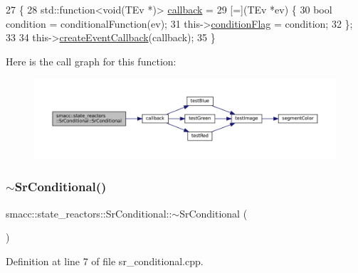 \begin{DoxyCode}
27     \{
28         std::function<void(TEv *)> \hyperlink{servers_2opencv__perception__node_2opencv__perception__node_8cpp_a050e697bd654facce10ea3f6549669b3}{callback} =
29             [=](TEv *ev) \{
30                 \textcolor{keywordtype}{bool} condition = conditionalFunction(ev);
31                 this->\hyperlink{classsmacc_1_1state__reactors_1_1SrConditional_a3642c78c02f02ed8eb0e5a41240f445c}{conditionFlag} = condition;
32             \};
33 
34         this->\hyperlink{classsmacc_1_1StateReactor_a68482e08f6449694a0bcda843b14b376}{createEventCallback}(callback);
35     \}
\end{DoxyCode}
Here is the call graph for this function\+:
\nopagebreak
\begin{figure}[H]
\begin{center}
\leavevmode
\includegraphics[width=350pt]{classsmacc_1_1state__reactors_1_1SrConditional_ab89bc8f9d29e8a614eb6618af8596402_cgraph}
\end{center}
\end{figure}
\mbox{\label{classsmacc_1_1state__reactors_1_1SrConditional_a36266efcfd8ba0582ed500bd51e7d2b6}} 
\subsubsection{\texorpdfstring{$\sim$\+Sr\+Conditional()}{~SrConditional()}}
{\footnotesize\ttfamily smacc\+::state\+\_\+reactors\+::\+Sr\+Conditional\+::$\sim$\+Sr\+Conditional (\begin{DoxyParamCaption}{ }\end{DoxyParamCaption})}



Definition at line 7 of file sr\+\_\+conditional.\+cpp.


